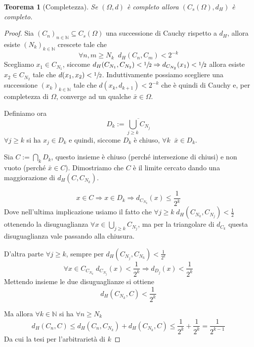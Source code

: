 \documentclass[a4paper,10pt]{article}
\newcounter{counter1}
\theoremstyle{plain}
\newtheorem{myteo}[counter1]{Teorema}
\theoremstyle{definition}
\theoremstyle{remark}
\newcommand{\obar}[1]{\overline{#1}}
\newcommand{\pa}[1]{\left(#1\right)}
\begin{document}
\begin{myteo}[Completezza{\cite[Proposizione 4.4.2]{ambrosio2000selected}}]
  Se $(\Omega,d)$ è completo allora $\pa{C_s(\Omega),d_H}$ è completo.
\end{myteo}
\begin{proof}
  Sia $\pa{C_n}_{n\in \mathbb{N}} \subseteq C_s(\Omega)$ una successione
  di Cauchy rispetto a $d_H$, allora esiste $\pa{N_k}_{k\in
    \mathbb{N}}$ crescete tale che 
  \[ \forall n,m \ge N_k\;\; d_H(C_n,C_m) < 2^{-k} \] Scegliamo
  $x_1\in C_{N_1}$, siccome $d_H(C_{N_1},C_{N_2}) < \sfrac{1}{2}
  \Rightarrow d_{C_{N_2}}(x_1) < \sfrac{1}{2}$ allora esiste $x_2\in
  C_{N_2}$ tale che $d(x_1,x_2) < \sfrac{1}{2}$. Induttivamente
  possiamo scegliere una successione $\pa{x_k}_{k\in \mathbb{N}}$ tale
  che $d(x_k,d_{k+1})<2^{-k}$ che è quindi di Cauchy e, per
  completezza di $\Omega$, converge ad un qualche $\bar x\in \Omega$.

  Definiamo ora 
  \[ D_k:= \obar{ \bigcup_{j \ge k} C_{N_j}} \]
  $\forall j \ge k$ si ha $x_j\in D_k$ e quindi, siccome $D_k$ è
  chiuso, $\forall k\;\; \bar x\in D_k$.

  Sia $C:=\bigcap _k D_k$, questo insieme è chiuso (perché
  intersezione di chiusi) e non vuoto (perché $\bar x\in
  C$). Dimostriamo che $C$ è il limite cercato dando una maggiorazione
  di $d_H(C,C_{N_k})$.

  \[ x\in C \Rightarrow x \in D_k \Rightarrow d_{C_{N_k}}(x) \le
  \frac{1}{2^k} \]
  Dove nell'ultima implicazione usiamo il fatto che $\forall j \ge k
  \; d_H(C_{N_k},C_{N_j}) < \frac{1}{2}$ ottenendo la disuguaglianza
  $\forall x \in \bigcup_{j \ge k} C_{N_j}$, ma per la triangolare di
  $d_{C_k}$ questa disuguaglianza vale passando alla chiusura.
  
  D'altra parte $\forall j\ge k$, sempre per $d_H(C_{N_j},C_{N_k}) <
  \frac{1}{2^k}$
  \[ \forall x \in C_{C_{N_k}}\; d_{C_{N_j}}(x) < \frac{1}{2^k}
  \Rightarrow d_{D_{j}}(x) < \frac{1}{2^k} \]
  Mettendo insieme le due disuguaglianze si ottiene
  \[ d_H(C_{N_k},C) < \frac{1}{2^k} \]
  
  Ma allora $\forall k \in \mathbb{N}$ si ha $\forall n \ge N_k$
  \[ d_H(C_n,C) \le d_H(C_n,C_{N_k}) + d_H(C_{N_k},C) \le
  \frac{1}{2^k} + \frac{1}{2^k} = \frac{1}{2^{k-1}} \]
  Da cui la tesi per l'arbitrarietà di $k$
\end{proof}
\end{document}
